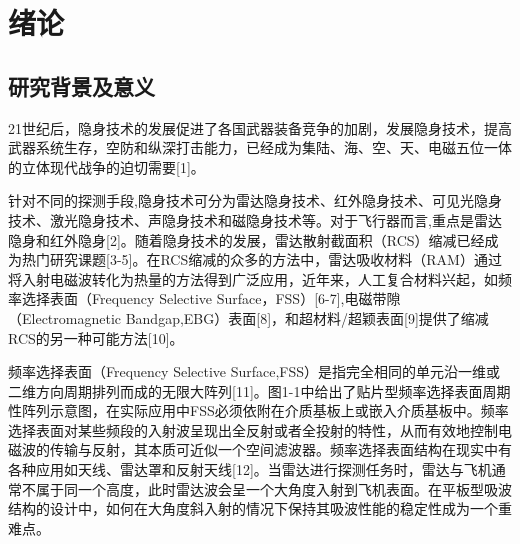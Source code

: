 \section{绪论}

\subsection{研究背景及意义}

21世纪后，隐身技术的发展促进了各国武器装备竞争的加剧，发展隐身技术，提高武器系统生存，空防和纵深打击能力，已经成为集陆、海、空、天、电磁五位一体的立体现代战争的迫切需要[1]。

针对不同的探测手段,隐身技术可分为雷达隐身技术、红外隐身技术、可见光隐身技术、激光隐身技术、声隐身技术和磁隐身技术等。对于飞行器而言,重点是雷达隐身和红外隐身[2]。随着隐身技术的发展，雷达散射截面积（RCS）缩减已经成为热门研究课题[3-5]。在RCS缩减的众多的方法中，雷达吸收材料（RAM）通过将入射电磁波转化为热量的方法得到广泛应用，近年来，人工复合材料兴起，如频率选择表面（Frequency Selective Surface，FSS）[6-7],电磁带隙（Electromagnetic Bandgap,EBG）表面[8]，和超材料/超颖表面[9]提供了缩减RCS的另一种可能方法[10]。

频率选择表面（Frequency Selective Surface,FSS）是指完全相同的单元沿一维或二维方向周期排列而成的无限大阵列[11]。图1-1中给出了贴片型频率选择表面周期性阵列示意图，在实际应用中FSS必须依附在介质基板上或嵌入介质基板中。频率选择表面对某些频段的入射波呈现出全反射或者全投射的特性，从而有效地控制电磁波的传输与反射，其本质可近似一个空间滤波器。频率选择表面结构在现实中有各种应用如天线、雷达罩和反射天线[12]。当雷达进行探测任务时，雷达与飞机通常不属于同一个高度，此时雷达波会呈一个大角度入射到飞机表面。在平板型吸波结构的设计中，如何在大角度斜入射的情况下保持其吸波性能的稳定性成为一个重难点。

